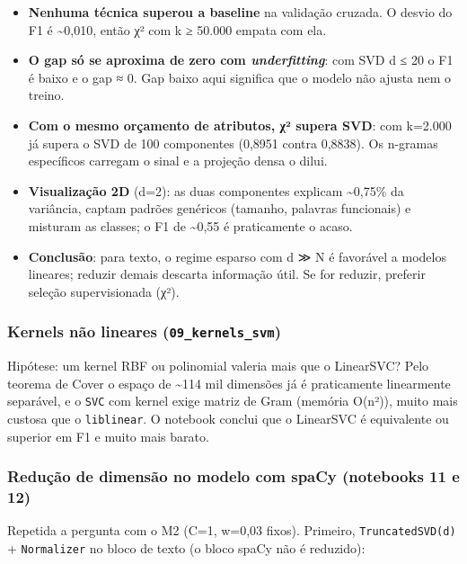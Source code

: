 \documentclass[
  brazilian,
  11pt,
]{article}
\providecommand{\tightlist}{%
  \setlength{\itemsep}{0pt}\setlength{\parskip}{0pt}}
\begin{document}
\begin{itemize}
\tightlist
\item
  \textbf{Nenhuma técnica superou a baseline} na validação cruzada. O desvio do F1 é \textasciitilde0,010, então χ² com k ≥ 50.000 empata com ela.
\item
  \textbf{O gap só se aproxima de zero com \emph{underfitting}}: com SVD d ≤ 20 o F1 é baixo e o gap ≈ 0. Gap baixo aqui significa que o modelo não ajusta nem o treino.
\item
  \textbf{Com o mesmo orçamento de atributos, χ² supera SVD}: com k=2.000 já supera o SVD de 100 componentes (0,8951 contra 0,8838). Os n-gramas específicos carregam o sinal e a projeção densa o dilui.
\item
  \textbf{Visualização 2D} (d=2): as duas componentes explicam \textasciitilde0,75\% da variância, captam padrões genéricos (tamanho, palavras funcionais) e misturam as classes; o F1 de \textasciitilde0,55 é praticamente o acaso.
\item
  \textbf{Conclusão}: para texto, o regime esparso com d ≫ N é favorável a modelos lineares; reduzir demais descarta informação útil. Se for reduzir, preferir seleção supervisionada (χ²).
\end{itemize}

\subsubsection{\texorpdfstring{Kernels não lineares (\texttt{09\_kernels\_svm})}{Kernels não lineares (09\_kernels\_svm)}}\label{kernels-nuxe3o-lineares-09_kernels_svm}

Hipótese: um kernel RBF ou polinomial valeria mais que o LinearSVC? Pelo teorema de Cover o espaço de \textasciitilde114 mil dimensões já é praticamente linearmente separável, e o \texttt{SVC} com kernel exige matriz de Gram (memória O(n²)), muito mais custosa que o \texttt{liblinear}. O notebook conclui que o LinearSVC é equivalente ou superior em F1 e muito mais barato.

\subsubsection{Redução de dimensão no modelo com spaCy (notebooks 11 e 12)}\label{reduuxe7uxe3o-de-dimensuxe3o-no-modelo-com-spacy-notebooks-11-e-12}

Repetida a pergunta com o M2 (C=1, w=0,03 fixos). Primeiro, \texttt{TruncatedSVD(d)} + \texttt{Normalizer} no bloco de texto (o bloco spaCy não é reduzido):
\end{document}
